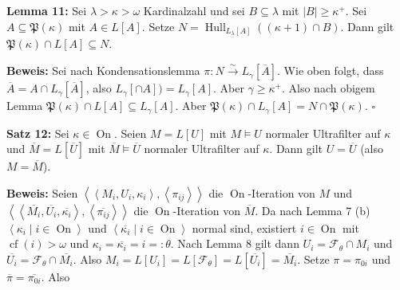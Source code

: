 \documentclass[a4paper,fontsize=11pt]{scrartcl}
\newcommand{\On}{\operatorname{On}}
\newcommand{\cf}{\operatorname{cf}}
\newcommand{\Hull}{\operatorname{Hull}}
\renewcommand{\bar}[1]{\overline{#1}}
\begin{document}
{\bf Lemma 11:} Sei $\lambda > \kappa > \omega$ Kardinalzahl und sei $B\subseteq\lambda$ mit $|B|\ge\kappa^+$. Sei $A\subseteq\mathfrak{P}(\kappa)$
mit $A\in L[A]$. Setze $N=\Hull_{L_\lambda[A]}((\kappa+1)\cap B)$. Dann gilt $\mathfrak{P}(\kappa)\cap L[A]\subseteq N$.

   {\bf Beweis:} Sei nach Kondensationslemma $\pi:N\xrightarrow{\sim}L_\gamma[\bar{A}]$. Wie oben folgt, dass $\bar{A}=A\cap L_\gamma[\bar{A}]$, also
   $L_\gamma[\cap{A}])=L_\gamma[A]$. Aber $\gamma\ge\kappa^+$. Also nach obigem Lemma $\mathfrak{P}(\kappa)\cap L[A]\subseteq L_\gamma[A]$. Aber
   $\mathfrak{P}(\kappa)\cap L_\gamma[A] = N\cap\mathfrak{P}(\kappa)$. \hfill $\square$

{\bf Satz 12:} Sei $\kappa\in\On$. Seien $M=L[U]$ mit $M\models U$ normaler Ultrafilter auf $\kappa$ und $\bar{M}=L[\bar{U}]$ mit
$\bar{M}\models\bar{U}$ normaler Ultrafilter auf $\kappa$. Dann gilt $U=\bar{U}$ (also $M=\bar{M}$).

   {\bf Beweis:} Seien $\left<\left<M_i,U_i,\kappa_i\right>,\left<\pi_{ij}\right>\right>$ die $\On$-Iteration von $M$ und
   $\left<\left<\bar{M_i},\bar{U_i},\bar{\kappa_i}\right>,\left<\bar{\pi_{ij}}\right>\right>$ die $\On$-Iteration von $\bar{M}$. Da nach Lemma 7 (b)
   $\left<\kappa_i\mid i\in\On\right>$ und $\left<\bar{\kappa_i}\mid i\in\On\right>$ normal sind, existiert $i\in\On$ mit $\cf(i)>\omega$ und
   $\kappa_i=\bar{\kappa_i}=i=:\theta$. Nach Lemma 8 gilt dann $U_i=\mathcal{F}_\theta\cap M_i$ und $\bar{U_i}=\mathcal{F}_\theta\cap\bar{M_i}$. Also
   $M_i=L[U_i]=L[\mathcal{F}_\theta]=L[\bar{U_i}]=\bar{M_i}$. Setze $\pi=\pi_{0i}$ und $\bar{\pi}=\bar{\pi_{0i}}$. Also
   \begin{center}
   \end{center}

\end{document}
